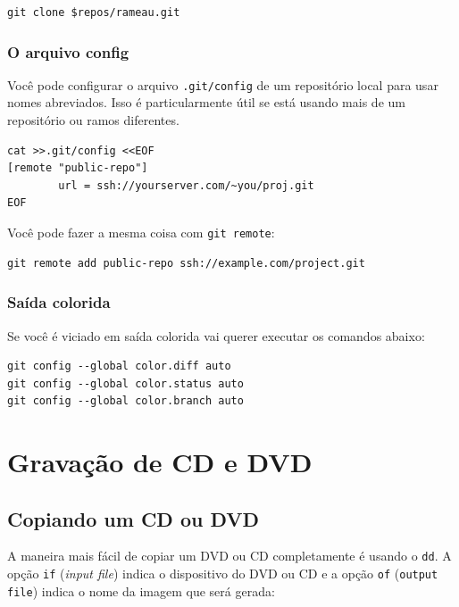 \documentclass[12pt,brazil]{book}
\begin{document}
\begin{verbatim}
git clone $repos/rameau.git
\end{verbatim}

\subsection{O arquivo config}
\label{sec:o-arquivo-config}

Você pode configurar o arquivo \texttt{.git/config} de um repositório
local para usar nomes abreviados. Isso é particularmente útil se está
usando mais de um repositório ou ramos diferentes.

\begin{verbatim}
cat >>.git/config <<EOF
[remote "public-repo"]
        url = ssh://yourserver.com/~you/proj.git
EOF
\end{verbatim}

Você pode fazer a mesma coisa com \texttt{git remote}:

\begin{verbatim}
git remote add public-repo ssh://example.com/project.git
\end{verbatim}

\subsection{Saída colorida}
\label{sec:saida-colorida}

Se você é viciado em saída colorida vai querer executar os comandos abaixo:

\begin{verbatim}
git config --global color.diff auto
git config --global color.status auto
git config --global color.branch auto
\end{verbatim}

\chapter{Gravação de CD e DVD}
\label{cha:gravacao-de-cd}

\section{Copiando um CD ou DVD}
\label{sec:copiando-um-cd}

A maneira mais fácil de copiar um DVD ou CD completamente é usando o
\texttt{dd}. A opção \texttt{if} (\textit{input file}) indica o
dispositivo do DVD ou CD e a opção \texttt{of} (\texttt{output file})
indica o nome da imagem que será gerada:
\end{document}
